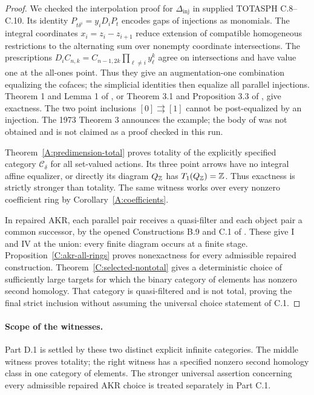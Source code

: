 \begin{proof}
We checked the interpolation proof for $\Delta_{\mathrm{inj}}$
in supplied TOTASPH C.8--C.10. Its identity
$P_{t\delta^i}=y_iD_iP_t$ encodes gaps of injections as monomials.
The integral coordinates $x_i=z_i-z_{i+1}$ reduce extension of
compatible homogeneous restrictions to the alternating sum over
nonempty coordinate intersections. The prescriptions
$D_iC_{n,k}=C_{n-1,2k}\prod_{\ell\ne i}y_\ell^k$ agree on
intersections and have value one at the all-ones point. Thus they
give an augmentation-one combination equalizing the cofaces;
the simplicial identities then equalize all parallel injections.
Theorem 1 and Lemma 1 of \citet{IsbellMitchell1973}, or Theorem
3.1 and Proposition 3.3 of \citet{IsbellMitchell1976}, give
exactness. The two point inclusions $[0]\rightrightarrows[1]$
cannot be post-equalized by an injection. The 1973 Theorem 3
announces the example; the body of \citet{Isbell1974} was not
obtained and is not claimed as a proof checked in this run.

Theorem~\ref{A:predimension-total} proves totality of the explicitly
specified category $\mathcal C_\delta$ for all set-valued actions.
Its three point arrows have no integral affine equalizer, or directly
its diagram $Q_\mathbb Z$ has $T_1(Q_\mathbb Z)=\mathbb Z$. Thus exactness is strictly
stronger than totality. The same witness works over every nonzero
coefficient ring by Corollary~\ref{A:coefficients}.

In repaired AKR, each parallel pair receives a quasi-filter and
each object pair a common successor, by the opened Constructions
B.9 and C.1 of \citet{AdamekKoubekReiterman1981}. These give I
and IV at the union: every finite diagram occurs at a finite stage.
Proposition~\ref{C:akr-all-rings} proves nonexactness for every
admissible repaired construction. Theorem~\ref{C:selected-nontotal}
gives a deterministic choice of sufficiently large targets for which
the binary category of elements has nonzero second homology. That
category is quasi-filtered and is not total, proving the final strict
inclusion without assuming the universal choice statement of C.1.
\end{proof}

\paragraph{Scope of the witnesses.}
Part D.1 is settled by these two distinct explicit infinite categories.
The middle witness proves totality; the right witness has a specified
nonzero second homology class in one category of elements.
The stronger universal assertion concerning every admissible repaired
AKR choice is treated separately in Part C.1.

